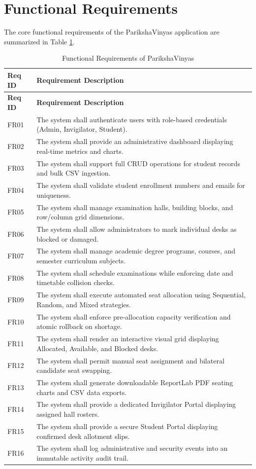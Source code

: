 \documentclass{InternshipReport}
\begin{document}
\section{Functional Requirements}
The core functional requirements of the ParikshaVinyas application are summarized in Table \ref{tab:functional_requirements}.

\begin{longtable}{p{} p{}}
\caption{Functional Requirements of ParikshaVinyas} \label{tab:functional_requirements} \\
\toprule
\textbf{Req ID} & \textbf{Requirement Description} \\
\midrule
\endfirsthead
\toprule
\textbf{Req ID} & \textbf{Requirement Description} \\
\midrule
\endhead
\bottomrule
\endfoot
FR01 & The system shall authenticate users with role-based credentials (Admin, Invigilator, Student). \\
FR02 & The system shall provide an administrative dashboard displaying real-time metrics and charts. \\
FR03 & The system shall support full CRUD operations for student records and bulk CSV ingestion. \\
FR04 & The system shall validate student enrollment numbers and emails for uniqueness. \\
FR05 & The system shall manage examination halls, building blocks, and row/column grid dimensions. \\
FR06 & The system shall allow administrators to mark individual desks as blocked or damaged. \\
FR07 & The system shall manage academic degree programs, courses, and semester curriculum subjects. \\
FR08 & The system shall schedule examinations while enforcing date and timetable collision checks. \\
FR09 & The system shall execute automated seat allocation using Sequential, Random, and Mixed strategies. \\
FR10 & The system shall enforce pre-allocation capacity verification and atomic rollback on shortage. \\
FR11 & The system shall render an interactive visual grid displaying Allocated, Available, and Blocked desks. \\
FR12 & The system shall permit manual seat assignment and bilateral candidate seat swapping. \\
FR13 & The system shall generate downloadable ReportLab PDF seating charts and CSV data exports. \\
FR14 & The system shall provide a dedicated Invigilator Portal displaying assigned hall rosters. \\
FR15 & The system shall provide a secure Student Portal displaying confirmed desk allotment slips. \\
FR16 & The system shall log administrative and security events into an immutable activity audit trail. \\
\bottomrule
\end{longtable}
\end{document}
